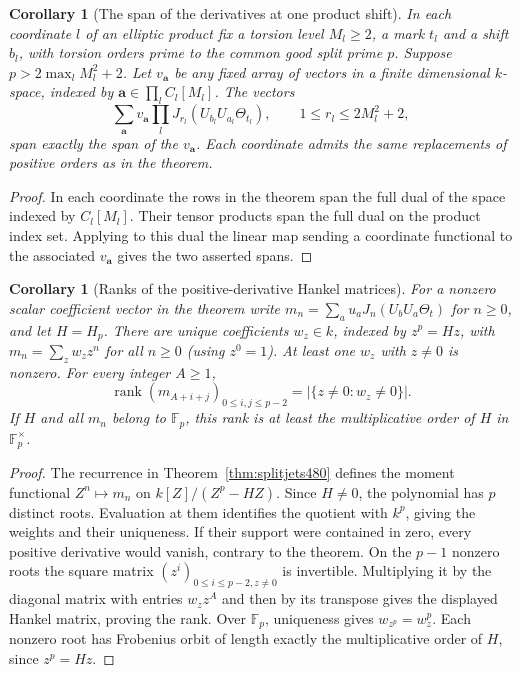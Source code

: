 \documentclass[a4paper,11pt]{article}
\newtheorem{corollary}[proposition]{Corollary}
\theoremstyle{definition}
\theoremstyle{remark}
\numberwithin{equation}{section}
\begin{document}
\begin{corollary}[The span of the derivatives at one product shift]\leavevmode
\label{cor:fixedproductjets482}
In each coordinate \(l\) of an elliptic product fix a torsion level
\(M_l\ge2\), a mark \(t_l\) and a shift \(b_l\), with torsion
orders prime to the common good split prime \(p\). Suppose
\(p>2\max_l M_l^2+2\). Let \(v_{\boldsymbol a}\) be any fixed
array of vectors in a finite dimensional \(k\)-space, indexed by
\(\boldsymbol a\in\prod_l C_l[M_l]\). The vectors
\[
 \sum_{\boldsymbol a}v_{\boldsymbol a}
       \prod_l J_{r_l}(U_{b_l}U_{a_l}\Theta_{t_l}),
           \qquad 1\le r_l\le 2M_l^2+2 ,
\]
span exactly the span of the \(v_{\boldsymbol a}\). Each
coordinate admits the same replacements of positive orders as
in the theorem.
\end{corollary}
\begin{proof}
In each coordinate the rows in the theorem span the full dual
of the space indexed by \(C_l[M_l]\). Their tensor products span
the full dual on the product index set. Applying to this dual
the linear map sending a coordinate functional to the associated
\(v_{\boldsymbol a}\) gives the two asserted spans.
\end{proof}

\begin{corollary}[Ranks of the positive-derivative Hankel matrices]\leavevmode
\label{cor:fixedhankel482}
For a nonzero scalar coefficient vector in the theorem write
\(m_n=\sum_a u_a J_n(U_bU_a\Theta_t)\) for \(n\ge0\), and let
\(H=H_p\). There are unique coefficients \(w_z\in k\), indexed
by \(z^p=Hz\), with \(m_n=\sum_z w_z z^n\) for all \(n\ge0\)
(using \(z^0=1\)). At least one \(w_z\) with \(z\ne0\) is
nonzero. For every integer \(A\ge1\),
\[
 \operatorname{rank}(m_{A+i+j})_{0\le i,j\le p-2}
       =|\{z\ne0:w_z\ne0\}|.
\]
If \(H\) and all \(m_n\) belong to \(\mathbb F_p\), this rank is
at least the multiplicative order of \(H\) in \(\mathbb F_p^\times\).
\end{corollary}
\begin{proof}
The recurrence in Theorem~\ref{thm:splitjets480} defines the
moment functional \(Z^n\mapsto m_n\) on \(k[Z]/(Z^p-HZ)\).
Since \(H\ne0\), the polynomial has \(p\) distinct roots.
Evaluation at them identifies the quotient with \(k^p\), giving
the weights and their uniqueness. If their support were contained
in zero, every positive derivative would vanish, contrary to the
theorem. On the \(p-1\) nonzero roots the square matrix
\((z^i)_{0\le i\le p-2,z\ne0}\) is invertible. Multiplying it by
the diagonal matrix with entries \(w_z z^A\) and then by its
transpose gives the displayed Hankel matrix, proving the rank.
Over \(\mathbb F_p\), uniqueness gives \(w_{z^p}=w_z^p\).
Each nonzero root has Frobenius orbit of length exactly the
multiplicative order of \(H\), since \(z^p=Hz\).
\end{proof}
\end{document}
